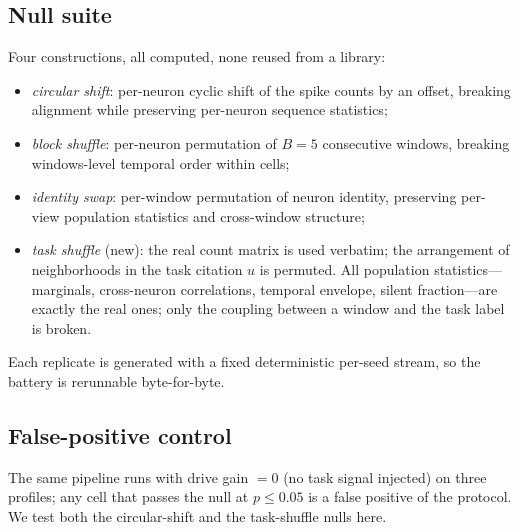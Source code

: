 \documentclass[journal]{IEEEtran}
\begin{document}
\subsection{Null suite}
Four constructions, all computed, none reused from a library:
\begin{itemize}
\item \emph{circular shift}: per-neuron cyclic shift of the spike counts by an
  offset, breaking alignment while preserving per-neuron sequence statistics;
\item \emph{block shuffle}: per-neuron permutation of $B=5$ consecutive windows,
  breaking windows-level temporal order within cells;
\item \emph{identity swap}: per-window permutation of neuron identity,
  preserving per-view population statistics and cross-window structure;
\item \emph{task shuffle} (new): the real count matrix is used verbatim; the
  arrangement of neighborhoods in the task citation $u$ is permuted. All
  population statistics---marginals, cross-neuron correlations, temporal
  envelope, silent fraction---are exactly the real ones; only the coupling
  between a window and the task label is broken.
\end{itemize}
Each replicate is generated with a fixed deterministic per-seed stream, so the
battery is rerunnable byte-for-byte.

\subsection{False-positive control}
The same pipeline runs with drive gain $=0$ (no task signal injected) on three
profiles; any cell that passes the null at $p\le0.05$ is a false positive of the
protocol. We test both the circular-shift and the task-shuffle nulls here.
\end{document}
